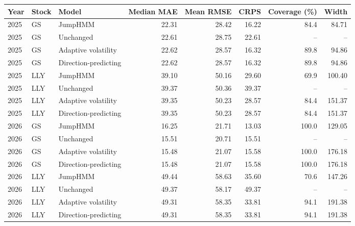 \begin{tabular}{lllrrrrr}
\toprule
Year & Stock & Model & Median MAE & Mean RMSE & CRPS & Coverage (\%) & Width \\
\midrule
2025 & GS & JumpHMM & 22.31 & 28.42 & 16.22 & 84.4 & 84.71 \\
2025 & GS & Unchanged & 22.61 & 28.75 & 22.61 & -- & -- \\
2025 & GS & Adaptive volatility & 22.62 & 28.57 & 16.32 & 89.8 & 94.86 \\
2025 & GS & Direction-predicting & 22.62 & 28.57 & 16.32 & 89.8 & 94.86 \\
2025 & LLY & JumpHMM & 39.10 & 50.16 & 29.60 & 69.9 & 100.40 \\
2025 & LLY & Unchanged & 39.37 & 50.36 & 39.37 & -- & -- \\
2025 & LLY & Adaptive volatility & 39.35 & 50.23 & 28.57 & 84.4 & 151.37 \\
2025 & LLY & Direction-predicting & 39.35 & 50.23 & 28.57 & 84.4 & 151.37 \\
2026 & GS & JumpHMM & 16.25 & 21.71 & 13.03 & 100.0 & 129.05 \\
2026 & GS & Unchanged & 15.51 & 20.71 & 15.51 & -- & -- \\
2026 & GS & Adaptive volatility & 15.48 & 21.07 & 15.58 & 100.0 & 176.18 \\
2026 & GS & Direction-predicting & 15.48 & 21.07 & 15.58 & 100.0 & 176.18 \\
2026 & LLY & JumpHMM & 49.44 & 58.63 & 35.60 & 70.6 & 147.26 \\
2026 & LLY & Unchanged & 49.37 & 58.17 & 49.37 & -- & -- \\
2026 & LLY & Adaptive volatility & 49.31 & 58.35 & 33.81 & 94.1 & 191.38 \\
2026 & LLY & Direction-predicting & 49.31 & 58.35 & 33.81 & 94.1 & 191.38 \\
\bottomrule
\end{tabular}
